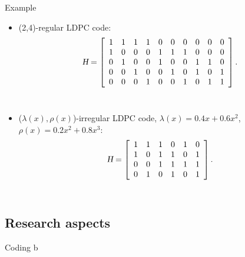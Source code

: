 \def\CTeXPreproc{Created by ctex v0.2.12, don't edit!}\documentclass{beamer}
\newcommand{\xieti}{\textsl}
\begin{document}
\begin{frame}
    \begin{block}{Example}
    \begin{itemize}
        \item (2,4)-regular LDPC code:
        \[
            \xieti{H}=
            \left[
            \begin{array}[]{cccccccccc}
            1 & 1 & 1 & 1 & 0 & 0 & 0 & 0 & 0 & 0\\
            1 & 0 & 0 & 0 & 1 & 1 & 1 & 0 & 0 & 0\\
            0 & 1 & 0 & 0 & 1 & 0 & 0 & 1 & 1 & 0\\
            0 & 0 & 1 & 0 & 0 & 1 & 0 & 1 & 0 & 1\\
            0 & 0 & 0 & 1 & 0 & 0 & 1 & 0 & 1 & 1\\
            \end{array}
            \right].
        \]\\
        \item ($\lambda(x), \rho(x)$)-irregular LDPC code, $\lambda(x)=0.4x+0.6x^2$, $\rho(x)=0.2x^2+0.8x^3:$
        \[
            \xieti{H}=
            \left[
            \begin{array}[]{cccccc}
            1 & 1 & 1 & 0 & 1 & 0 \\
            1 & 0 & 1 & 1 & 0 & 1 \\
            0 & 0 & 1 & 1 & 1 & 1 \\
            0 & 1 & 0 & 1 & 0 & 1
            \end{array}
            \right].
        \]\\
    \end{itemize}
    \end{block}
\end{frame}
\subsection{Research aspects}


\begin{frame}{Coding}
b
\end{frame}
\end{document}
